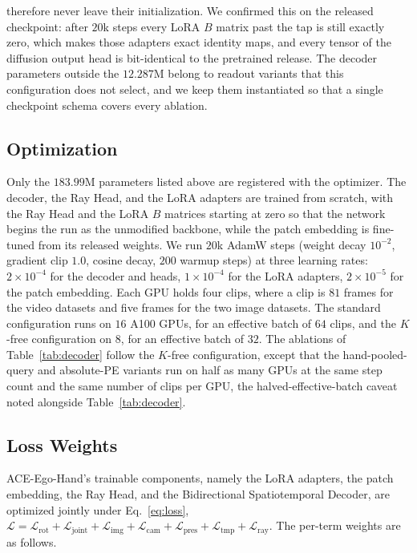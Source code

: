\documentclass[10pt,twocolumn,letterpaper]{article}
\newcommand{\method}{ACE-Ego-Hand} %
\begin{document}
therefore never leave their initialization. We confirmed this on the released checkpoint: after $20$k steps every LoRA $B$ matrix past the tap is still exactly zero, which makes those adapters exact identity maps, and every tensor of the diffusion output head is bit-identical to the pretrained release. The decoder parameters outside the $12.287$M belong to readout variants that this configuration does not select, and we keep them instantiated so that a single checkpoint schema covers every ablation.

\subsection{Optimization}
Only the $183.99$M parameters listed above are registered with the optimizer. The decoder, the Ray Head, and the LoRA adapters are trained from scratch, with the Ray Head and the LoRA $B$ matrices starting at zero so that the network begins the run as the unmodified backbone, while the patch embedding is fine-tuned from its released weights. We run $20$k AdamW steps (weight decay $10^{-2}$, gradient clip $1.0$, cosine decay, $200$ warmup steps) at three learning rates: $2{\times}10^{-4}$ for the decoder and heads, $1{\times}10^{-4}$ for the LoRA adapters, $2{\times}10^{-5}$ for the patch embedding. Each GPU holds four clips, where a clip is $81$ frames for the video datasets and five frames for the two image datasets. The standard configuration runs on $16$ A100 GPUs, for an effective batch of $64$ clips, and the $K$-free configuration on $8$, for an effective batch of $32$. The ablations of Table~\ref{tab:decoder} follow the $K$-free configuration, except that the hand-pooled-query and absolute-PE variants run on half as many GPUs at the same step count and the same number of clips per GPU, the halved-effective-batch caveat noted alongside Table~\ref{tab:decoder}.

\subsection{Loss Weights}
\method{}'s trainable components, namely the LoRA adapters, the patch embedding, the Ray Head, and the Bidirectional Spatiotemporal Decoder, are optimized jointly under Eq.~\eqref{eq:loss}, $\mathcal{L}=\mathcal{L}_{\mathrm{rot}}+\mathcal{L}_{\mathrm{joint}}+\mathcal{L}_{\mathrm{img}}+\mathcal{L}_{\mathrm{cam}}+\mathcal{L}_{\mathrm{pres}}+\mathcal{L}_{\mathrm{tmp}}+\mathcal{L}_{\mathrm{ray}}$. The per-term weights are as follows.
\end{document}
